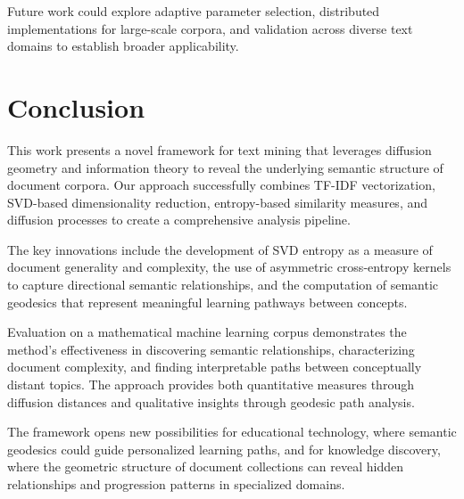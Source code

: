 \documentclass[12pt,a4paper]{article}
\begin{document}
Future work could explore adaptive parameter selection, distributed implementations for large-scale corpora, and validation across diverse text domains to establish broader applicability.

\section{Conclusion}

This work presents a novel framework for text mining that leverages diffusion geometry and information theory to reveal the underlying semantic structure of document corpora. Our approach successfully combines TF-IDF vectorization, SVD-based dimensionality reduction, entropy-based similarity measures, and diffusion processes to create a comprehensive analysis pipeline.

The key innovations include the development of SVD entropy as a measure of document generality and complexity, the use of asymmetric cross-entropy kernels to capture directional semantic relationships, and the computation of semantic geodesics that represent meaningful learning pathways between concepts.

Evaluation on a mathematical machine learning corpus demonstrates the method's effectiveness in discovering semantic relationships, characterizing document complexity, and finding interpretable paths between conceptually distant topics. The approach provides both quantitative measures through diffusion distances and qualitative insights through geodesic path analysis.

The framework opens new possibilities for educational technology, where semantic geodesics could guide personalized learning paths, and for knowledge discovery, where the geometric structure of document collections can reveal hidden relationships and progression patterns in specialized domains.
\end{document}
